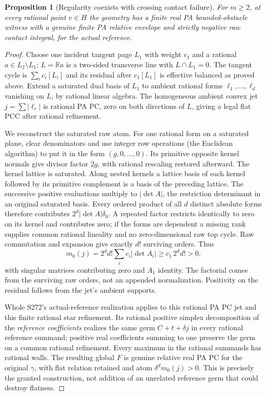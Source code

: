 \documentclass[11pt]{article}
\newtheorem{proposition}[theorem]{Proposition}
\newcommand{\R}{\mathbb R}
\begin{document}
\begin{proposition}[Regularity coexists with crossing contact failure]\label{prop:contact}
For $m\geq2$, at every rational point $v\in H$ the geometry has a finite real PA bounded-obstacle witness with a genuine finite PA relative envelope and strictly negative raw contact integral, for the actual reference.
\end{proposition}
\begin{proof}
Choose one incident tangent page $L_1$ with weight $c_1$ and a rational $a\in L_2\setminus L_1$; $L=\R a$ is a two-sided transverse line with $L\cap L_1=0$. The tangent cycle is $\sum_i c_i[L_i]$ and its residual after $c_1[L_1]$ is effective balanced as proved above. Extend a saturated dual basis of $L_1$ to ambient rational forms $\ell_1,\ldots,\ell_d$ vanishing on $L$, by rational linear algebra. The homogeneous ambient convex jet $j=\sum|\ell_r|$ is rational PA PC, zero on both directions of $L$, giving a legal flat PCC after rational refinement.

We reconstruct the saturated raw atom. For one rational form on a saturated plane, clear denominators and use integer row operations (the Euclidean algorithm) to put it in the form $(g,0,\ldots,0)$. Its primitive opposite kernel normals give divisor factor $2g$, with rational rescaling restored afterward. The kernel lattice is saturated. Along nested kernels a lattice basis of each kernel followed by its primitive complement is a basis of the preceding lattice. The successive positive evaluations multiply to $|\det A|$, the restriction determinant in an original saturated basis. Every ordered product of all $d$ distinct absolute forms therefore contributes $2^d|\det A|\delta_0$. A repeated factor restricts identically to zero on its kernel and contributes zero; if the forms are dependent a missing rank supplies common rational lineality and no zero-dimensional raw top cycle. Raw commutation and expansion give exactly $d!$ surviving orders. Thus
\[
 m_0(j)=2^dd!\sum_i c_i|\det A_i|\geq c_1\,2^dd!>0,
\]
with singular matrices contributing zero and $A_1$ identity. The factorial comes from the surviving raw orders, not an appended normalization. Positivity on the residual follows from the jet's ambient supports.

Whole S272's actual-reference realization applies to this rational PA PC jet and this finite rational star refinement. Its rational positive simplex decomposition of the \emph{reference coefficients} realizes the same germ $C+t+\delta j$ in every rational reference summand; positive real coefficients summing to one preserve the germ on a common rational refinement. Every maximum in the rational summands has rational walls. The resulting global $F$ is genuine relative real PA PC for the original $\gamma$, with flat relation retained and atom $\delta^d m_0(j)>0$. This is precisely the granted construction, not addition of an unrelated reference germ that could destroy flatness.


\end{proof}
\end{document}
